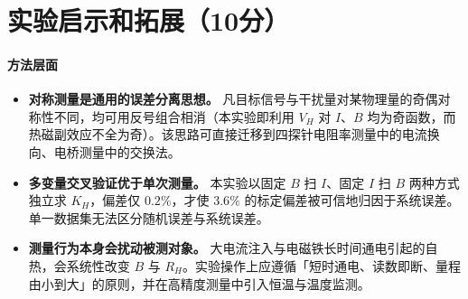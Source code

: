 \documentclass[12pt,a4paper]{ctexart}
\begin{document}
\section*{实验启示和拓展（10分）}
\paragraph{方法层面}
\begin{itemize}
    \item \textbf{对称测量是通用的误差分离思想。} 凡目标信号与干扰量对某物理量的奇偶对称性不同，均可用反号组合相消（本实验即利用 $V_H$ 对 $I$、$B$ 均为奇函数，而热磁副效应不全为奇）。该思路可直接迁移到四探针电阻率测量中的电流换向、电桥测量中的交换法。
    \item \textbf{多变量交叉验证优于单次测量。} 本实验以固定 $B$ 扫 $I$、固定 $I$ 扫 $B$ 两种方式独立求 $K_H$，偏差仅 $0.2\%$，才使 $3.6\%$ 的标定偏差被可信地归因于系统误差。单一数据集无法区分随机误差与系统误差。
    \item \textbf{测量行为本身会扰动被测对象。} 大电流注入与电磁铁长时间通电引起的自热，会系统性改变 $B$ 与 $R_H$。实验操作上应遵循「短时通电、读数即断、量程由小到大」的原则，并在高精度测量中引入恒温与温度监测。
\end{itemize}
\end{document}
